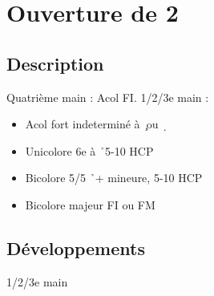\documentclass[a4paper]{article}
\begin{document}
\section{Ouverture de 2\pdfd}

\subsection{Description}

Quatrième main : Acol FI.
1/2/3e main :

\begin{itemize}
\item Acol fort indeterminé à \c\ ou \d\ 

\item Unicolore 6e à \h\ 5-10 HCP 

\item Bicolore 5/5 \h\ + mineure, 5-10 HCP

\item Bicolore majeur FI ou FM

\end{itemize}

\subsection{Développements}

1/2/3e main
\end{document}

